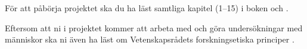 För att påbörja projektet ska du ha läst samtliga kapitel (1--15) i boken 
 \citep{Sharp2011idb} och  
\cite{Nielsen2013mu}.

Eftersom att ni i projektet kommer att arbeta med och göra undersökningar med 
människor ska ni även ha läst om Vetenskapsrådets forskningsetiska principer
\citep{VR2002fpi}.
